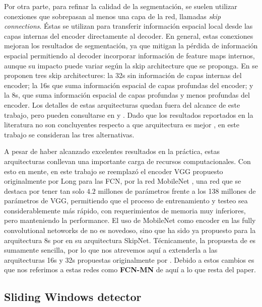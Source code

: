 \documentclass[a4paper,authoryear,review]{elsarticle}
\begin{document}
	Por otra parte, para refinar la calidad de la segmentación, se suelen utilizar conexiones que sobrepasan al menos una capa de la red, llamadas \emph{skip connections}. Éstas se utilizan para transferir información espacial local desde las capas internas del encoder directamente al decoder. En general, estas conexiones mejoran los resultados de segmentación, ya que mitigan la pérdida de información espacial permitiendo al decoder incorporar información de feature maps internos, aunque su impacto puede variar según la skip architecture que se proponga. En \citet{long2015fully} se proponen tres skip architectures: la 32s sin información de capas internas del encoder; la 16s que suma información espacial de capas profundas del encoder; y la 8s, que suma información espacial de capas profundas y menos profundas del encoder. Los detalles de estas arquitecturas quedan fuera del alcance de este trabajo, pero pueden consultarse en \citet{long2015fully} y \cite{shelhamer2017fully}. Dado que los resultados reportados en la literatura no son concluyentes respecto a que arquitectura es mejor \cite{long2015fully, shelhamer2017fully}, en este trabajo se consideran las tres alternativas.
	
	A pesar de haber alcanzado excelentes resultados en la práctica,  estas arquitecturas conllevan una importante carga de recursos computacionales. Con esto en mente, en este trabajo se reemplazó el encoder VGG \cite{Simonyan2015VeryDC} propuesto originalmente por Long para las FCN, por la red MobileNet \cite{howard2017mobilenets}, una red que se destaca por tener tan solo $4.2$ millones de parámetros frente a los 138 millones de parámetros de VGG, permitiendo que el proceso de entrenamiento y testeo sea considerablemente más rápido, con requerimientos de memoria muy inferiores, pero manteniendo la performance. El uso de MobileNet como encoder en las fully convolutional netoworks de \citet{long2015fully} no es novedoso, sino que ha sido ya propuesto para la arquitectura 8s por \citet{siam2018rtseg} en su arquitectura SkipNet. Técnicamente, la propuesta de \citet{siam2018rtseg} es sumamente sencilla, por lo que nos atrevemos aquí a extenderla a las arquitecturas 16s y 32s propuestas originalmente por \citep{long2015fully}. Debido a estos cambios es que nos referimos a estas redes como \textbf{FCN-MN} de aquí a lo que resta del paper.
	
	
	\subsection{Sliding Windows detector}
	\label{sec:sw}
	
\end{document}
